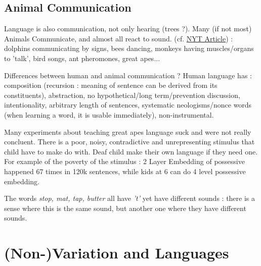 \documentclass{cours}
\begin{document}
\subsection{Animal Communication}
Language is also communication, not only hearing (trees ?). Many (if not most) Animals Communicate, and almost all react to sound. (cf. \href{https://www.nytimes.com/2023/09/20/magazine/animal-communication.html?unlocked_article_code=_mKij4e1jtSDj61vUQZVjQCPQ678hO69vto7sqwbRaA3kmyw5b8t-mxMcnihQgvfCJuKaQe1pvift5_AInBSESFgm2rBtU7GDoS_gyv_G6GUnUjV5Wb8L_Cb4YjsG-BFKXy_yO3FYnECOJFaCdmGPS7pCbPH8lqQcH5l4mixJE4IfNzBPeACptp-hnBmdQkb0jkD9qa06NCzE12I22V_m94Uh6YT-76HUyTwGvPuYKgrb0-F-xoAdiItiAZoUDJzWBY2GIujcO8Hw7TiORkZXfc8MRihzb4S7i6_eZR1mWD4-yafAQQP4Ya_hFCSV-wmJKxSHpSSrMFpoK9n4sdL&smid=url-share}{NYT Article})
\! : dolphins communicating by signs, bees dancing, monkeys having muscles/organs to 'talk', bird songs, ant pheromones, great apes... 

Differences between human and animal communication ? Human language has\! : composition (recursion\! : meaning of sentence can be derived from its constituents), abstraction, no hypothetical/long term/prevention discussion, intentionality, arbitrary length of sentences, systematic neologisms/nonce words (when learning a word, it is usable immediately), non-instrumental.

Many experiments about teaching great apes language suck and were not really concluent. There is a poor, noisy, contradictive and unrepresenting stimulus that child have to make do with. Deaf child make their own language if they need one. For example of the poverty of the stimulus\! : 2 Layer Embedding of possessive happened 67 times in 120k sentences, while kids at 6 can do 4 level possessive embedding. 

The words \textsl{stop, mat, tap, butter} all have \textsl{'t'} yet have different sounds\! : there is a sense where this is the same sound, but another one where they have different sounds.

\section[Cours 2 \! :28/09]{(Non-)Variation and Languages}
\end{document}
